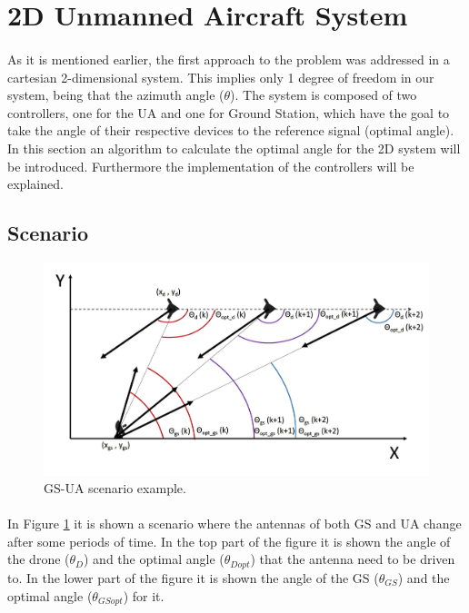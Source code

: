 
\section{2D Unmanned Aircraft System}\label{sec:2d_sim}
\paragraph{}As it is mentioned earlier, the first approach to the problem was addressed in a cartesian 2-dimensional system. This implies only 1 degree of freedom in our system, being that the azimuth angle ($\theta$). The system is composed of two controllers, one for the UA and one for Ground Station, which have the goal to take the angle of their respective devices to the reference signal (optimal angle). In this section an algorithm to calculate the optimal angle for the 2D system will be introduced. Furthermore the implementation of the controllers will be explained.

\subsection*{Scenario}

\begin{figure}[h]
	\centering
	\includegraphics[scale=0.45]{figures/drone_gs_ex_1.jpg}
	\caption{GS-UA scenario example.}
	\label{fig:ua_gs}
\end{figure}

\paragraph{}In Figure \ref{fig:ua_gs} it is shown a scenario where the antennas of both GS and UA change after some periods of time. In the top part of the figure it is shown the angle of the drone ($\theta_{D}$) and the optimal angle ($\theta_{Dopt}$) that the antenna need to be driven to. In the lower part of the figure it is shown the angle of the GS ($\theta_{GS}$) and the optimal angle ($\theta_{GSopt}$) for it. 

